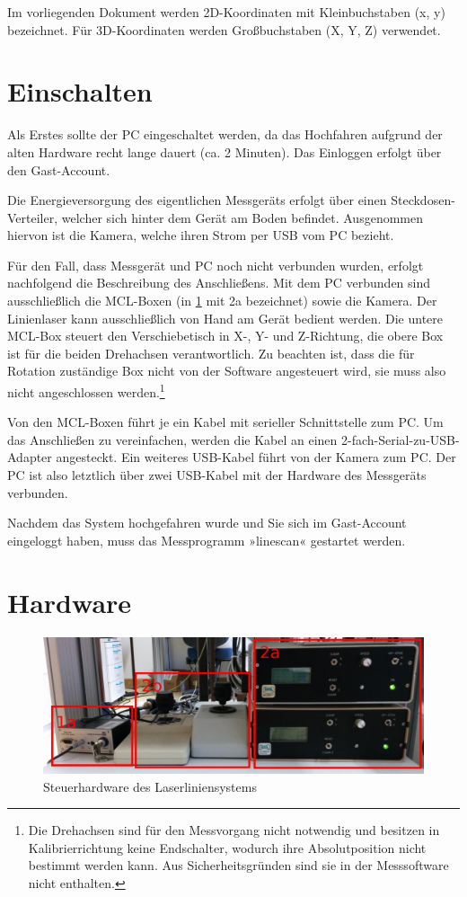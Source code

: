 \documentclass[a4paper,10pt]{scrartcl}
\begin{document}
Im vorliegenden Dokument werden 2D-Koordinaten mit Kleinbuchstaben (x, y) bezeichnet.
Für 3D-Koordinaten werden Großbuchstaben (X, Y, Z) verwendet.

\section{Einschalten}

Als Erstes sollte der PC eingeschaltet werden, da das Hochfahren aufgrund der alten Hardware
recht lange dauert (ca. 2 Minuten). Das Einloggen erfolgt über den Gast-Account.

Die Energieversorgung des eigentlichen Messgeräts erfolgt über einen Steckdosen-Verteiler, welcher sich
hinter dem Gerät am Boden befindet. Ausgenommen hiervon ist die Kamera, welche ihren Strom per USB vom
PC bezieht.

Für den Fall, dass Messgerät und PC noch nicht verbunden wurden, erfolgt nachfolgend die Beschreibung
des Anschließens. Mit dem PC verbunden sind ausschließlich die MCL-Boxen (in \cref{fig:Steuerhardware}
mit 2a bezeichnet) sowie die Kamera. Der Linienlaser kann ausschließlich von Hand am Gerät bedient
werden. Die untere MCL-Box steuert den Verschiebetisch in X-, Y- und Z-Richtung, die obere Box ist für
die beiden Drehachsen verantwortlich. Zu beachten ist, dass die für Rotation zuständige Box nicht von der
Software angesteuert wird, sie muss also nicht angeschlossen werden.\footnote{Die Drehachsen sind für den
Messvorgang nicht notwendig und besitzen in Kalibrierrichtung keine Endschalter, wodurch ihre Absolutposition
nicht bestimmt werden kann. Aus Sicherheitsgründen sind sie in der Messsoftware nicht enthalten.}

Von den MCL-Boxen führt je ein Kabel mit serieller Schnittstelle zum PC. Um das Anschließen zu
vereinfachen, werden die Kabel an einen 2-fach-Serial-zu-USB-Adapter angesteckt. Ein weiteres
USB-Kabel führt von der Kamera zum PC. Der PC ist also letztlich über zwei USB-Kabel mit der Hardware
des Messgeräts verbunden.

Nachdem das System hochgefahren wurde und Sie sich im Gast-Account eingeloggt haben, muss das
Messprogramm »linescan« gestartet werden.

\section{Hardware}

\begin{figure}[h]
  \centering
  \includegraphics[width=\textwidth]{include/IMG_20160412_140339.jpg}
  \caption{Steuerhardware des Laserliniensystems}
  \label{fig:Steuerhardware}
\end{figure}
\end{document}
